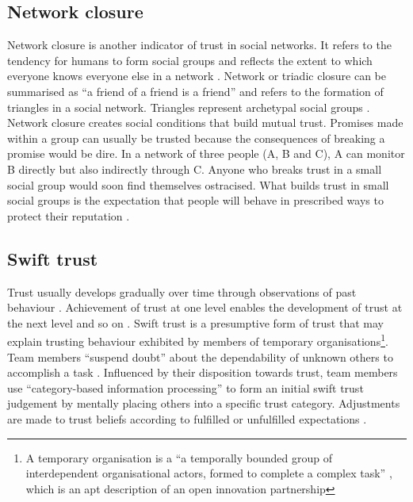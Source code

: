 \subsection{Network closure}

Network closure is another indicator of trust in social networks. It refers to the tendency for humans to form social groups and reflects the extent to which everyone knows everyone else in a network \citep{coleman1990foundation}. Network or triadic closure can be summarised as \enquote{a friend of a friend is a friend} and refers to the formation of triangles in a social network. Triangles represent archetypal social groups \citep{robins2015doing}. Network closure creates social conditions that build mutual trust. Promises made within a group can usually be trusted because the consequences of breaking a promise would be dire. In a network of three people (A, B and C), A can monitor B directly but also indirectly through C. Anyone who breaks trust in a small social group would soon find themselves ostracised. What builds trust in small social groups is the expectation that people will behave in prescribed ways to protect their reputation \citep{burt2005brokerage}. 

\subsection{Swift trust}

Trust usually develops gradually over time through observations of past behaviour \citep{mayer1995integrative}. Achievement of trust at one level enables the development of trust at the next level and so on \citep{robert2009individual}. Swift trust is a presumptive form of trust that may explain trusting behaviour exhibited by members of temporary organisations\footnote{A temporary organisation is a \enquote{a temporally bounded group of interdependent organisational actors, formed to complete a complex task} \citep{burke2016temporary}, which is an apt description of an open innovation partnership}. Team members \enquote{suspend doubt} about the dependability of unknown others to accomplish a task \citep{germain2014role}. Influenced by their disposition towards trust, team members use \enquote{category-based information processing} to form an initial swift trust judgement by mentally placing others into a specific trust category. Adjustments are made to trust beliefs according to fulfilled or unfulfilled expectations \citep{meyerson1996swift,robert2009individual}. \medskip

